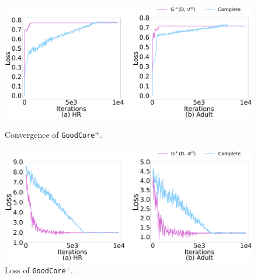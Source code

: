 \begin{figure}[t]   
	\centering
	\begin{minipage}[t]{0.49\textwidth}
		\centering
		\includegraphics[width=\columnwidth]{figs/G+_a}
		\caption{Convergence of \texttt{GoodCore}$^+$.}
		\label{fig:converge_G+}
	\end{minipage}
	\begin{minipage}[t]{0.49\textwidth}
		\centering
		\includegraphics[width=\columnwidth]{figs/G+}
		\caption{Loss of \texttt{GoodCore}$^+$.}
		\label{fig:real_loss_G+}
	\end{minipage}
	\vspace*{-1em}   
\end{figure}




